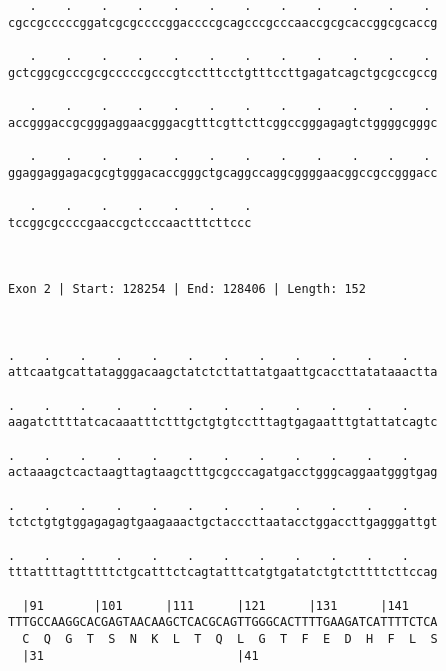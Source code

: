 \documentclass{article}
\begin{document}
\begin{Verbatim}
   .    .    .    .    .    .    .    .    .    .    .    . 
cgccgcccccggatcgcgccccggaccccgcagcccgcccaaccgcgcaccggcgcaccg
                                                            
   .    .    .    .    .    .    .    .    .    .    .    . 
gctcggcgcccgcgcccccgcccgtcctttcctgtttccttgagatcagctgcgccgccg
                                                            
   .    .    .    .    .    .    .    .    .    .    .    . 
accgggaccgcgggaggaacgggacgtttcgttcttcggccgggagagtctggggcgggc
                                                            
   .    .    .    .    .    .    .    .    .    .    .    . 
ggaggaggagacgcgtgggacaccgggctgcaggccaggcggggaacggccgccgggacc
                                                            
   .    .    .    .    .    .    .
tccggcgccccgaaccgctcccaactttcttccc
                                  
                                  
 
Exon 2 | Start: 128254 | End: 128406 | Length: 152



.    .    .    .    .    .    .    .    .    .    .    .    
attcaatgcattatagggacaagctatctcttattatgaattgcaccttatataaactta
                                                            
.    .    .    .    .    .    .    .    .    .    .    .    
aagatcttttatcacaaatttctttgctgtgtcctttagtgagaatttgtattatcagtc
                                                            
.    .    .    .    .    .    .    .    .    .    .    .    
actaaagctcactaagttagtaagctttgcgcccagatgacctgggcaggaatgggtgag
                                                            
.    .    .    .    .    .    .    .    .    .    .    .    
tctctgtgtggagagagtgaagaaactgctacccttaatacctggaccttgagggattgt
                                                            
.    .    .    .    .    .    .    .    .    .    .    .    
tttattttagtttttctgcatttctcagtatttcatgtgatatctgtctttttcttccag
                                                            
  |91       |101      |111      |121      |131      |141    
TTTGCCAAGGCACGAGTAACAAGCTCACGCAGTTGGGCACTTTTGAAGATCATTTTCTCA
  C  Q  G  T  S  N  K  L  T  Q  L  G  T  F  E  D  H  F  L  S
  |31                           |41                         
  

\end{Verbatim}
\end{document}
